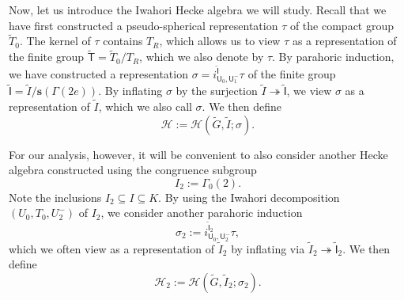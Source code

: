 \documentclass[10pt, letterpaper]{amsart}
\theoremstyle{plain}
\theoremstyle{definition}
\numberwithin{equation}{section}
\newcommand{\Gt}{\widetilde{G}}
\newcommand{\It}{\widetilde{I}}
\newcommand{\Tt}{\widetilde{T}}
\newcommand{\s}{\mathbf{s}}
\newcommand{\Hcal}{\mathcal{H}}
\newcommand{\If}{\mathsf{I}}
\newcommand{\Tf}{\mathsf{T}}
\newcommand{\Uf}{\mathsf{U}}
\newcommand{\Ift}{\widetilde{\mathsf{I}}}
\newcommand{\Tft}{\widetilde{\mathsf{T}}}
\begin{document}

Now, let us introduce the Iwahori Hecke algebra we will study. Recall that we have first constructed a pseudo-spherical representation $\tau$ of the compact group $\Tt_0$. The kernel of $\tau$ contains $T_R$, which allows us to view $\tau$ as a representation of the finite group $\Tft=\Tt_0\slash T_R$, which we also denote by $\tau$. By parahoric induction, we have constructed a representation  $\sigma=i_{{\Uf}_{0},{\Uf}_{1}^{-}}^{\Ift}\tau$ of the finite group $\Ift=\It\slash \s(\Gamma(2e))$. By inflating $\sigma$ by the surjection $\It\twoheadrightarrow \widetilde{{\If}}$, we view $\sigma$ as a representation of $\It$, which we also call $\sigma$. We then define 
\begin{equation*}
	\mathcal{H}:=\mathcal{H}(\Gt,\widetilde{I};\sigma).
\end{equation*}

For our analysis, however, it will be convenient to also consider another Hecke algebra constructed using the congruence subgroup 
\[
I_{2}:=\Gamma_{0}(2).
\]
Note the inclusions $I_2\subseteq I\subseteq K$. By using the Iwahori decomposition $(U_0, T_0, U_2^-)$ of $I_2$, we consider another parahoric induction
\[
\sigma_{2}:=i_{{\Uf}_{0},{\Uf}_{2}^{-}}^{\Ift_2}\tau,
\]
which we often view as a representation of $\It_2$ by inflating via $\It_2\twoheadrightarrow \Ift_2$. We then define 
\begin{equation*}
	\Hcal_{2}:=\mathcal{H}(\Gt,\It_2;\sigma_{2}).
\end{equation*}
\end{document}
